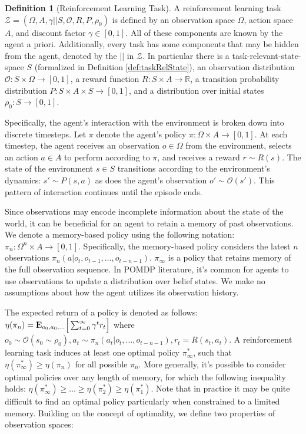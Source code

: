 \documentclass{article} %
\newcommand{\Expect}{{\rm I\kern-.3em E}}
\theoremstyle{definition}
\newtheorem{definition}{Definition}[section]
\begin{document}
\begin{definition}[Reinforcement Learning Task]
\label{def:markov}
A reinforcement learning task $\mathcal{Z} = (\Omega, A, \gamma || S,
\mathcal{O}, R, P, \rho_0)$ is defined by an observation
space $\Omega$, action space $A$, and discount factor $\gamma \in
[0,1]$. All of these components are known by the agent
a priori. Additionally, every task has some components that may be
hidden from the agent, denoted by the $||$ in $\mathcal{Z}$. In
particular there is a task-relevant-state-space $S$ (formalized in
Definition \ref{def:taskRelState}), an observation distribution
$\mathcal{O}: S \times \Omega \rightarrow [0,1]$, a reward function $R
: S \times A \rightarrow \mathbb{R}$, a transition probability
distribution $P : S \times A \times S \rightarrow [0,1]$, and a
distribution over initial states $\rho_0: S \rightarrow [0,1]$.

Specifically, the agent's interaction with the environment is broken
down into discrete timesteps. Let $\pi$ denote the agent's policy $\pi
: \Omega \times A \rightarrow [0,1]$. At each timestep, the agent
receives an observation $o \in \Omega$ from the environment, selects
an action $a \in A$ to perform according to $\pi$, and receives a
reward $r \sim R(s)$. The state of the environment $s \in S$
transitions according to the environment's dynamics: $s' \sim P(s,a)$
as does the agent's observation $o' \sim \mathcal{O}(s')$. This
pattern of interaction continues until the episode ends.
\end{definition}

Since observations may encode incomplete information about the state
of the world, it can be beneficial for an agent to retain a memory of
past observations. We denote a memory-based policy using the following
notation: $\pi_n : \Omega^n \times A \rightarrow [0,1]$. Specifically,
the memory-based policy considers the latest $n$ observations
$\pi_n(a|o_t, o_{t-1}, \dots, o_{t-n-1})$. $\pi_\infty$ is a policy
that retains memory of the full observation sequence. In POMDP
literature, it's common for agents to use observations to update a
distribution over belief states. We make no assumptions about how the
agent utilizes its observation history.

The expected return of a policy is denoted as follows: $\eta(\pi_n) =
\Expect_{o_0, a_0, \dots} \Big [ \sum_{t=0}^\infty \gamma^t r_t \Big
]$ where $o_0 \sim \mathcal{O}(s_0 \sim \rho_0), a_t \sim
\pi_n(a_t|o_t,\dots,o_{t-n-1}), r_t = R(s_t,a_t)$. A reinforcement
learning task induces at least one optimal policy $\pi^*_\infty$, such
that $\eta(\pi^*_\infty) \ge \eta(\pi_n)$ for all possible
$\pi_n$. More generally, it's possible to consider optimal policies
over any length of memory, for which the following inequality holds:
$\eta(\pi^*_\infty) \ge \dots \ge \eta(\pi^*_2) \ge
\eta(\pi^*_1)$. Note that in practice it may be quite difficult to
find an optimal policy particularly when constrained to a limited
memory. Building on the concept of optimality, we define two
properties of observation spaces:
\end{document}
